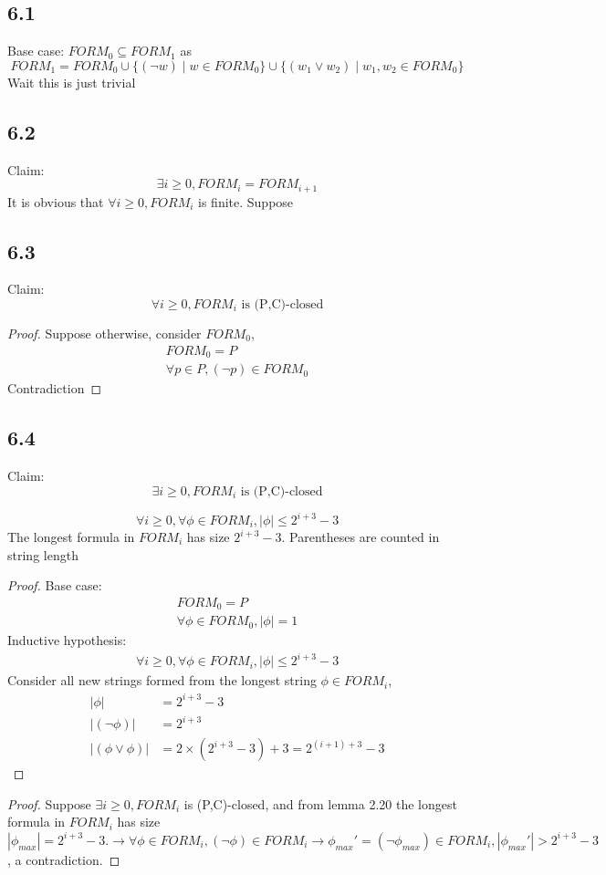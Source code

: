 \documentclass{article}
\newtheorem{lemma}[theorem]{Lemma}
\let\oldlemma\lemma
\let\endoldlemma\endlemma
\renewenvironment{lemma}
  {\begin{tcolorbox}[
      colback=green!8,
      colframe=green!50!black,
      boxrule=0.6pt,
      arc=2pt,
      left=6pt,right=6pt,top=4pt,bottom=4pt
    ]\oldlemma}
  {\endoldlemma\end{tcolorbox}}
\begin{document}
\subsection*{6.1}
Base case: $FORM_0 \subseteq FORM_1$
    as \[FORM_1 = FORM_0 \cup \{(\neg w)\mid w \in FORM_0\} \cup \{(w_1 \lor w_2) \mid w_1, w_2 \in FORM_0\}\]
    Wait this is just trivial
\subsection*{6.2}
Claim: \[\exists i \geq 0, FORM_i = FORM_{i+1}\]
It is obvious that $\forall i \geq 0, FORM_i$ is finite. Suppose 

\subsection*{6.3}
Claim:\[\forall i \geq 0, FORM_i \text{ is (P,C)-closed}\]
\begin{proof}
    Suppose otherwise, consider $FORM_0$, 
    \begin{align*}
        FORM_0 = P\\
        \forall p \in P, (\neg p) \in FORM_0
    \end{align*}
    Contradiction
\end{proof}
\subsection*{6.4}
Claim: \[\exists i \geq 0, FORM_i \text{ is (P,C)-closed}\]
\begin{lemma}
    \[\forall i \geq 0, \forall \phi \in FORM_i, |\phi| \leq 2^{i+3} - 3\]
    The longest formula in $FORM_i$ has size $2^{i+3}-3$. Parentheses are counted in string length
\end{lemma}
\begin{proof}
    Base case: 
    \begin{align*}
        FORM_0 = P\\
        \forall \phi \in FORM_0, |\phi| = 1
    \end{align*}
    Inductive hypothesis:
    \begin{align*}
        \forall i \geq 0, \forall \phi \in FORM_i, |\phi| \leq 2^{i+3} - 3
    \end{align*}
    Consider all new strings formed from the longest string $\phi \in FORM_i$, 
    \begin{align*}
        |\phi| &= 2^{i+3} - 3\\
        |(\neg \phi)| &= 2^{i+3}\\
        |(\phi \lor \phi)| &=  2\times (2^{i+3} - 3) + 3 = 2^{(i+1)+3} - 3
    \end{align*}
\end{proof}
\begin{proof}

Suppose $\exists i \geq 0, FORM_i $ is (P,C)-closed, and from lemma 2.20 the longest formula in $FORM_i$ has size 
$|\phi_{max}| = 2^{i+3} - 3. \rightarrow \forall \phi \in FORM_i, (\neg \phi) \in FORM_i \rightarrow \phi_{max}' = (\neg \phi_{max}) \in FORM_i, |\phi_{max}'| > 2^{i+3} - 3$, a contradiction.

\end{proof}
\end{document}
